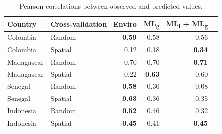 \documentclass[11pt]{article}
\begin{document}
\begin{table}[h!]
\caption{Pearson correlations between observed and predicted values. }
\centering
\begin{tabular}{llrrrr}
Country &  Cross-validation & Enviro &   ML\textsubscript{g} & ML\textsubscript{l} + ML\textsubscript{g} \\
\hline 
 Colombia & Random &  \textbf{0.59} &0.58 & 0.56 \\
 Colombia &  Spatial &  0.12 &  0.18 & \textbf{0.34}\\
 Madagascar &  Random &  0.70 &  0.70 & \textbf{0.71} \\
 Madagascar &  Spatial &  0.22 &  \textbf{0.63} & 0.60\\
 Senegal &  Random &  \textbf{0.58} &  0.30 & 0.08 \\
 Senegal &  Spatial &  \textbf{0.63} & 0.36 & 0.35 \\
 Indonesia &  Random &  \textbf{0.52} & 0.46 & 0.32 \\
 Indonesia &  Spatial &  \textbf{0.45} & 0.41 & \textbf{0.45} \\
\end{tabular}
\label{t:results2}
\end{table}


\end{document}
